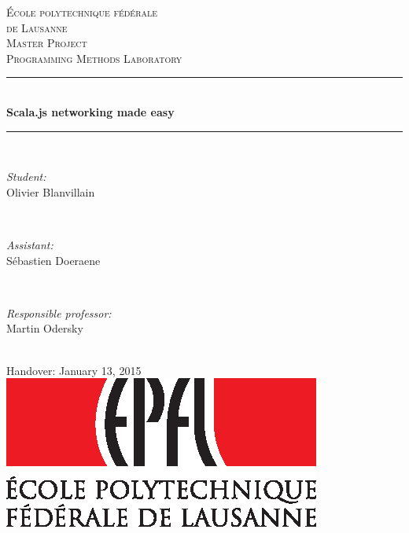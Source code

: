 \begin{titlepage}

\newcommand{\HRule}{\rule{\linewidth}{0.5mm}}

\center
 
\textsc{\LARGE École polytechnique fédérale\\de Lausanne}\\[1.5cm]
\textsc{\Large Master Project}\\[0.5cm]
\textsc{\large Programming Methods Laboratory }\\[0.5cm]

\HRule \\[0.45cm]
{ \huge \bfseries Scala.js networking made easy}\\[0.2cm]
\HRule \\[1.5cm]

\begin{minipage}{0.3\textwidth}
\begin{flushleft} \large
\emph{Student:}\\
Olivier Blanvillain
\end{flushleft}
\end{minipage}
\\[0.7cm]

\begin{minipage}{0.3\textwidth}
\begin{flushleft} \large
\emph{Assistant:} \\
Sébastien Doeraene
\end{flushleft}
\end{minipage}
\\[0.7cm]

\begin{minipage}{0.3\textwidth}
\begin{flushleft} \large
\emph{Responsible professor:} \\
Martin Odersky
\end{flushleft}
\end{minipage}
\\[1.5cm]

{\large Handover: January 13, 2015} \\[1.5cm]

\includegraphics{epfl.eps} \\[1cm]

\vfill

\end{titlepage}

\begin{titlepage}
~\vfill
\end{titlepage}
